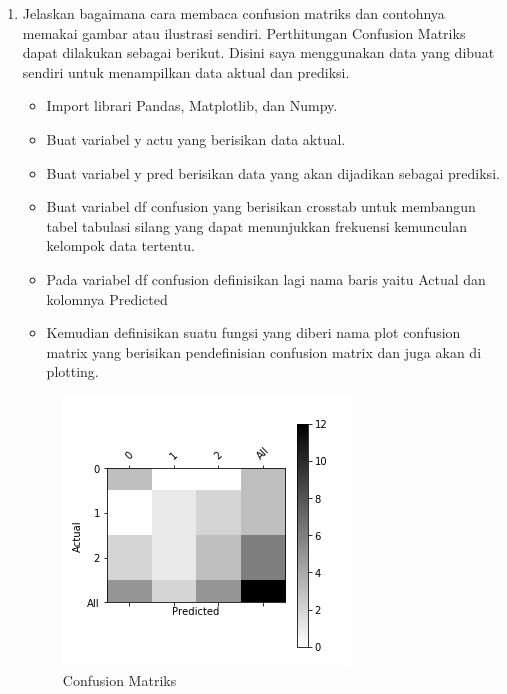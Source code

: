 \begin{enumerate}
\item Jelaskan bagaimana cara membaca confusion matriks dan contohnya memakai gambar atau ilustrasi sendiri.
Perthitungan Confusion Matriks dapat dilakukan sebagai berikut. Disini saya menggunakan data yang dibuat sendiri untuk menampilkan data aktual dan prediksi.
\begin{itemize}
\item
Import librari Pandas, Matplotlib, dan Numpy.
\item
Buat variabel y actu yang berisikan data aktual.
\item
Buat variabel y pred berisikan data yang akan dijadikan sebagai prediksi.
\item
Buat variabel df confusion yang berisikan crosstab untuk membangun tabel tabulasi silang yang dapat menunjukkan frekuensi kemunculan kelompok data tertentu.
\item
Pada variabel df confusion definisikan lagi nama baris yaitu Actual dan kolomnya Predicted
\item
Kemudian definisikan suatu fungsi yang diberi nama plot confusion matrix yang berisikan pendefinisian confusion matrix dan juga akan di plotting.

\end{itemize}
\begin{figure}[ht]
\centering
\includegraphics[scale=0.5]{figures/1174050/chapter3/1.PNG}
\caption{Confusion Matriks}
\label{contoh}
\end{figure}


\end{enumerate}
